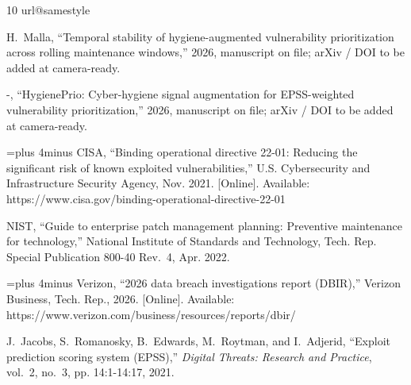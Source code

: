 \documentclass[journal]{IEEEtran}
\begin{document}
\begin{thebibliography}{10}
\providecommand{\url}[1]{#1}
\csname url@samestyle\endcsname
\providecommand{\newblock}{\relax}
\providecommand{\bibinfo}[2]{#2}
\providecommand{\BIBentrySTDinterwordspacing}{\spaceskip=0pt\relax}
\providecommand{\BIBentryALTinterwordstretchfactor}{4}
\providecommand{\BIBentryALTinterwordspacing}{\spaceskip=\fontdimen2\font plus
\BIBentryALTinterwordstretchfactor\fontdimen3\font minus
  \fontdimen4\font\relax}
\providecommand{\BIBforeignlanguage}[2]{{%
\expandafter\ifx\csname l@#1\endcsname\relax
\typeout{** WARNING: IEEEtran.bst: No hyphenation pattern has been}%
\typeout{** loaded for the language `#1'. Using the pattern for}%
\typeout{** the default language instead.}%
\else
\language=\csname l@#1\endcsname
\fi
#2}}
\providecommand{\BIBdecl}{\relax}
\BIBdecl

H.~Malla, ``Temporal stability of hygiene-augmented vulnerability
  prioritization across rolling maintenance windows,'' 2026, manuscript on
  file; arXiv / DOI to be added at camera-ready.

-, ``{HygienePrio}: Cyber-hygiene signal augmentation for {EPSS}-weighted
  vulnerability prioritization,'' 2026, manuscript on file; arXiv / DOI to be
  added at camera-ready.

\BIBentryALTinterwordspacing
{CISA}, ``Binding operational directive 22-01: Reducing the significant risk of
  known exploited vulnerabilities,'' U.S. Cybersecurity and Infrastructure
  Security Agency, Nov. 2021. [Online]. Available:
  \url{https://www.cisa.gov/binding-operational-directive-22-01}
\BIBentrySTDinterwordspacing

{NIST}, ``Guide to enterprise patch management planning: Preventive maintenance
  for technology,'' National Institute of Standards and Technology, Tech. Rep.
  Special Publication 800-40 Rev.~4, Apr. 2022.

\BIBentryALTinterwordspacing
{Verizon}, ``2026 data breach investigations report ({DBIR}),'' Verizon
  Business, Tech. Rep., 2026. [Online]. Available:
  \url{https://www.verizon.com/business/resources/reports/dbir/}
\BIBentrySTDinterwordspacing

J.~Jacobs, S.~Romanosky, B.~Edwards, M.~Roytman, and I.~Adjerid, ``Exploit
  prediction scoring system ({EPSS}),'' \emph{Digital Threats: Research and
  Practice}, vol.~2, no.~3, pp. 14:1-14:17, 2021.


\end{thebibliography}
\end{document}
